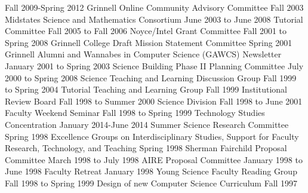 \begin{cventries}
  {Fall 2009-Spring 2012}
  {Grinnell Online Community Advisory Committee}
  {Fall 2003}
  {Midstates Science and Mathematics Consortium}
  {June 2003 to June 2008}
  {Tutorial Committee}
  {Fall 2005 to Fall 2006}
  {Noyce/Intel Grant Committee}
  {Fall 2001 to Spring 2008}
  {Grinnell College Draft Mission Statement Committee}
  {Spring 2001}
  {Grinnell Alumni and Wannabes in Computer Science (GAWCS) Newsletter}
  {January 2001 to Spring 2003}
  {Science Building Phase II Planning Committee}
  {July 2000 to Spring 2008}
  {Science Teaching and Learning Discussion Group}
  {Fall 1999 to Spring 2004}
  {Tutorial Teaching and Learning Group}
  {Fall 1999}
  {Institutional Review Board}
  {Fall 1998 to Summer 2000}
  {Science Division}
  {Fall 1998 to June 2001}
  {Faculty Weekend Seminar}
  {Fall 1998 to Spring 1999}
  {Technology Studies Concentration}
  {January 2014-June 2014}
  {Summer Science Research Committee}
  {Spring 1998}
  {Excellence Groups on Interdisciplinary Studies, Support for Faculty Research, Technology, and Teaching}
  {Spring 1998}
  {Sherman Fairchild Proposal Committee}
  {March 1998 to July 1998}
  {AIRE Proposal Committee}
  {January 1998 to June 1998}
  {Faculty Retreat}
  {January 1998}
  {Young Science Faculty Reading Group}
  {Fall 1998 to Spring 1999}
  {Design of new Computer Science Curriculum}
  {Fall 1997}

\end{cventries}
